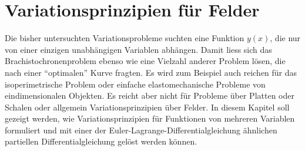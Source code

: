 %
%
%
\chapter{Variationsprinzipien für Felder
\label{buch:chapter:felder}}
Die bisher untersuchten Variationsprobleme suchten eine Funktion
$y(x)$, die nur von einer einzigen unabhängigen Variablen abhängen.
Damit liess sich das Brachistochronenproblem ebenso wie eine
Vielzahl anderer Problem lösen, die nach einer ``optimalen''
Kurve fragten.
Es wird zum Beispiel auch reichen für das isoperimetrische Problem
oder einfache elastomechanische Probleme von eindimensionalen
Objekten.
Es reicht aber nicht für Probleme über Platten oder Schalen oder
allgemein Variationsprinzipien über Felder.
In diesem Kapitel soll gezeigt werden, wie Variationsprinzipien
für Funktionen von mehreren Variablen formuliert und mit einer
der Euler-Lagrange-Differentialgleichung ähnlichen partiellen
Differentialgleichung gelöst werden können.





\uebungsabschnitt

\begin{uebungsaufgaben}
\end{uebungsaufgaben}
\enduebungsabschnitt

